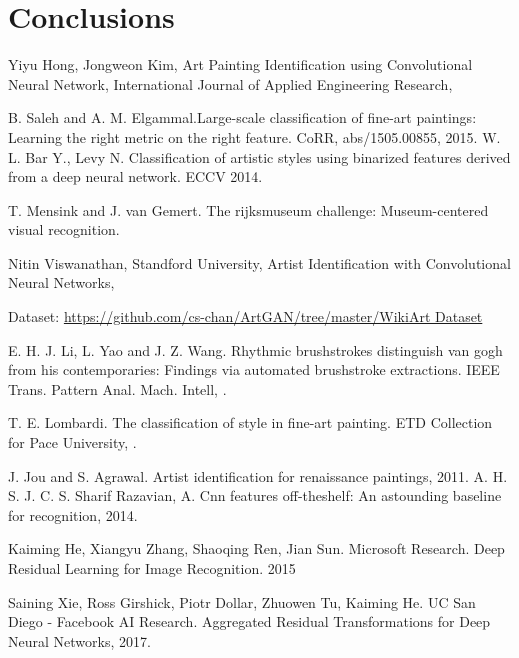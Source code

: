 \documentclass{article}
\begin{document}
\section{Conclusions}\label{conclusions}

\begin{thebibliography}{1}
	
	Yiyu Hong, Jongweon Kim, \newblock  Art Painting Identification using Convolutional Neural Network, \newblock International Journal of Applied Engineering Research, 
	
	B. Saleh and A. M. Elgammal.\newblock  Large-scale classification
	of fine-art paintings: Learning the right metric on the right
	feature. \newblock CoRR, abs/1505.00855, 2015.
	W. L. Bar Y., Levy N. Classification of artistic styles using binarized features derived from a deep neural network.
	ECCV 2014.
	
	T. Mensink and J. van Gemert. \newblock The rijksmuseum challenge:
	Museum-centered visual recognition. 
	
	
	Nitin Viswanathan, Standford University,
	\newblock Artist Identification with Convolutional Neural Networks, 
	
	Dataset:
	\url{https://github.com/cs-chan/ArtGAN/tree/master/WikiArt Dataset}
	
	E. H. J. Li, L. Yao and J. Z. Wang. \newblock Rhythmic brushstrokes
	distinguish van gogh from his contemporaries: Findings via
	automated brushstroke extractions. IEEE Trans. Pattern
	Anal. Mach. Intell, .
		
	T. E. Lombardi. \newblock The classification of style in fine-art painting. ETD Collection for Pace University, .
	
	J. Jou and S. Agrawal. Artist identification for renaissance
	paintings, 2011.
	A. H. S. J. C. S. Sharif Razavian, A. Cnn features off-theshelf: An astounding baseline for recognition, 2014.
	
	Kaiming He, Xiangyu Zhang, Shaoqing Ren, Jian Sun. Microsoft Research. 
	Deep Residual Learning for Image Recognition. 2015
	
	Saining Xie, Ross Girshick, Piotr Dollar, Zhuowen Tu, Kaiming He. UC San Diego - Facebook AI Research. Aggregated Residual Transformations for Deep Neural Networks, 2017.
	

\end{thebibliography}
\end{document}
